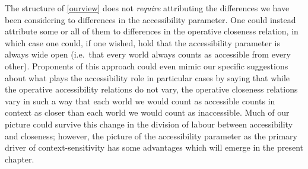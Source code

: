 \documentclass[If.tex]{subfiles}
\begin{document}
The structure of \ref{ourview} does not \emph{require} attributing the differences we have been considering to differences in the accessibility parameter.  One could instead attribute some or all of them to differences in the operative closeness relation, in which case one could, if one wished, hold that the accessibility parameter is always wide open (i.e.\ that every world always counts as accessible from every other).  Proponents of this approach could even mimic our specific suggestions about what plays the accessibility role in particular cases by saying that while the operative accessibility relations do not vary, the operative closeness relations vary in such a way that each world we would count as accessible counts in context as closer than each world we would count as inaccessible.  Much of our picture could survive this change in the division of labour between accessibility and closeness; however, the picture of the accessibility parameter as the primary driver of context-sensitivity has some advantages which will emerge in the present chapter.  


\end{document}
